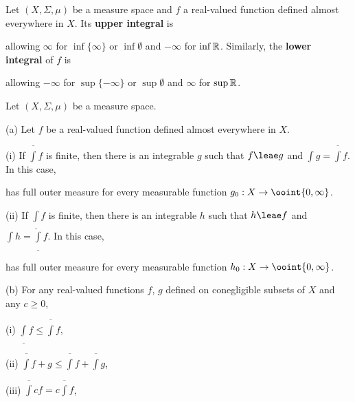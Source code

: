       
   Let $(X,\Sigma,\mu)$ be a 
measure space and $f$ a real-valued function defined almost everywhere 
in $X$.   Its {\bf upper integral} is 
      
      
\noindent allowing $\infty$ for $\inf\{\infty\}$ or $\inf\emptyset$ 
and $-\infty$ for 
$\inf\Bbb R$.   Similarly, the {\bf lower integral} of $f$ is 
      
      
\noindent allowing $-\infty$ for $\sup\{-\infty\}$ or $\sup\emptyset$ 
and $\infty$ for $\sup\Bbb R$. 
      
 Let $(X,\Sigma,\mu)$ be a  
measure space. 
      
(a) Let $f$ be a real-valued function defined almost everywhere in $X$. 
      
\quad (i) If $\overline{\int}f$ is finite, then there is 
an integrable $g$ such that $f\leae g$ and $\int g=\overline{\int}f$. 
In this case, 
 
 
\noindent has full outer measure for every measurable function 
$g_0:X\to\ooint{0,\infty}$. 
      
\quad (ii) If $\underline{\int}f$ is finite, 
then there is an integrable $h$ such that $h\leae f$ and 
$\int h=\underline{\int}f$.   In this case, 
 
 
\noindent has full outer measure for every measurable function 
$h_0:X\to\ooint{0,\infty}$. 
      
{(b)} For any real-valued functions $f$, $g$ defined on conegligible 
subsets of $X$ and any $c\ge 0$, 
      
\vskip 2pt 
      
\quad(i) $\underline{\int}f\le\overline{\int}f$, 
      
\vskip2pt 
      
\quad (ii) $\overline{\int}f+g\le\overline{\int}f+\overline{\int}g$, 
      
\vskip2pt 
      
\quad (iii) $\overline{\int}cf=c\overline{\int}f$, 
      
